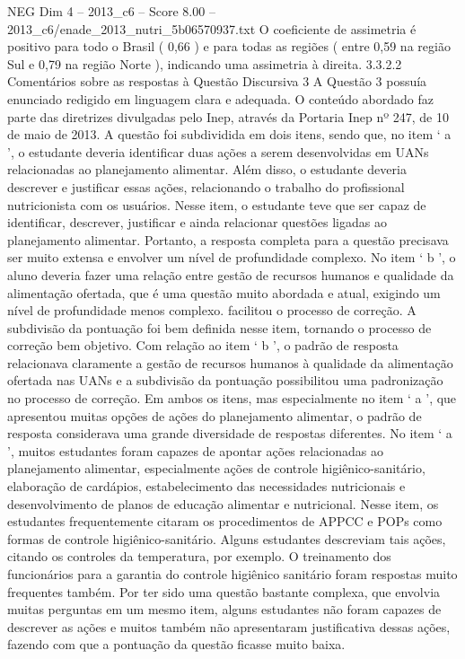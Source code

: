 \begin{textsample}{NEG Dim 4 – 2013\_c6 – Score 8.00 – 2013\_c6/enade\_2013\_nutri\_5b06570937.txt}
O coeficiente de assimetria é positivo para todo o Brasil ( 0,66 ) e para todas as regiões ( entre 0,59 na região Sul e 0,79 na região Norte ), indicando uma assimetria à direita. 3.3.2.2 Comentários sobre as respostas à Questão Discursiva 3 A Questão 3 possuía enunciado redigido em linguagem clara e adequada.
O conteúdo abordado faz parte das diretrizes divulgadas pelo Inep, através da Portaria Inep nº 247, de 10 de maio de 2013.
A questão foi subdividida em dois itens, sendo que, no item ‘ a ’, o estudante deveria identificar duas ações a serem desenvolvidas em UANs relacionadas ao planejamento alimentar.
Além disso, o estudante deveria descrever e justificar essas ações, relacionando o trabalho do profissional nutricionista com os usuários.
Nesse item, o estudante teve que ser capaz de identificar, descrever, justificar e ainda relacionar questões ligadas ao planejamento alimentar.
Portanto, a resposta completa para a questão precisava ser muito extensa e envolver um nível de profundidade complexo.
No item ‘ b ’, o aluno deveria fazer uma relação entre gestão de recursos humanos e qualidade da alimentação ofertada, que é uma questão muito abordada e atual, exigindo um nível de profundidade menos complexo. facilitou o processo de correção.
A subdivisão da pontuação foi bem definida nesse item, tornando o processo de correção bem objetivo.
Com relação ao item ‘ b ’, o padrão de resposta relacionava claramente a gestão de recursos humanos à qualidade da alimentação ofertada nas UANs e a subdivisão da pontuação possibilitou uma padronização no processo de correção.
Em ambos os itens, mas especialmente no item ‘ a ’, que apresentou muitas opções de ações do planejamento alimentar, o padrão de resposta considerava uma grande diversidade de respostas diferentes.
No item ‘ a ’, muitos estudantes foram capazes de apontar ações relacionadas ao planejamento alimentar, especialmente ações de controle higiênico-sanitário, elaboração de cardápios, estabelecimento das necessidades nutricionais e desenvolvimento de planos de educação alimentar e nutricional.
Nesse item, os estudantes frequentemente citaram os procedimentos de APPCC e POPs como formas de controle higiênico-sanitário.
Alguns estudantes descreviam tais ações, citando os controles da temperatura, por exemplo.
O treinamento dos funcionários para a garantia do controle higiênico sanitário foram respostas muito frequentes também.
Por ter sido uma questão bastante complexa, que envolvia muitas perguntas em um mesmo item, alguns estudantes não foram capazes de descrever as ações e muitos também não apresentaram justificativa dessas ações, fazendo com que a pontuação da questão ficasse muito baixa.

\end{textsample}
